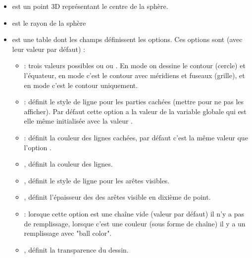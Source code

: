 \begin{itemize}
    \item {} est un point 3D représentant le centre de la sphère.
    \item {} est le rayon de la sphère
    \item {} est une table dont les champs définissent les options. Ces options sont (avec leur valeur par défaut) :
        \begin{itemize}
            \item {} : trois valeurs possibles  ou  ou . En mode  on dessine le contour (cercle) et l'équateur, en mode  c'est le contour avec méridiens et fuseaux (grille), et en mode  c'est le contour uniquement.
            
            \item {} : définit le style de ligne pour les parties cachées (mettre  pour ne pas les afficher). Par défaut cette option a la valeur de la variable globale  qui est elle même initialisée avec la valeur .
            
            \item {}: définit la couleur des lignes cachées, par défaut c'est la même valeur que l'option .
            
            \item {}, définit la couleur des lignes.

            \item {}, définit le style de ligne pour les arêtes visibles.

            \item {}, définit l'épaisseur des des arêtes visible en dixième de point.            
    
            \item {}: lorsque cette option est une chaîne vide (valeur par défaut) il n'y a pas de remplissage, lorsque c'est une couleur (sous forme de chaîne) il y a un remplissage avec "ball color".
            
            \item {}, définit la transparence du dessin.
        \end{itemize}
\end{itemize}

